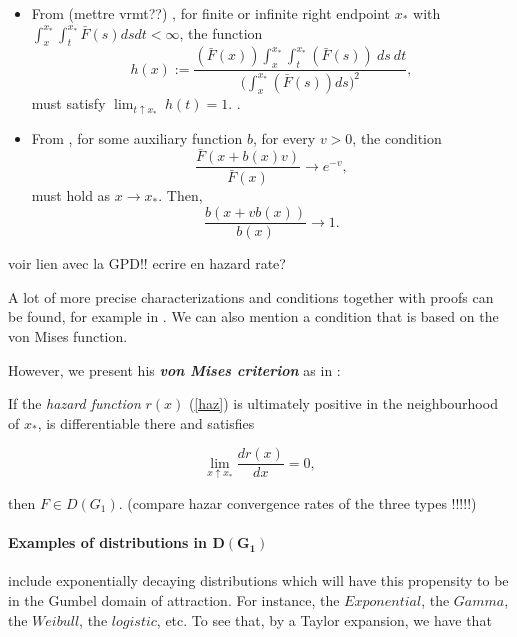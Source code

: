 \documentclass[11pt,a4paper,openany ]{book}
\begin{document}
\begin{itemize}
	\item  From (mettre vrmt??)
	\cite[pp.20]{haan_extreme_2006}, for finite or infinite right endpoint $x_*$ with $\int_x^{x_*}\int_t^{x_*}\bar{F}(s)dsdt<\infty$, the function 
	\begin{equation*}
	h(x):=\frac{(\bar{F}(x))\int_x^{x_*}\int_t^{x_*}(\bar{F}(s))\ ds\ dt}{\bigg(\int_x^{x_*}(\bar{F}(s))ds\bigg)^2},
	\end{equation*}
	must satisfy $\displaystyle{\lim_{t \uparrow x_*}}\ h(t)=1$. . 
	
	\item From \cite[pp.72]{beirlant_statistics_2006},
	for some auxiliary function $b$, for every $v>0$, the condition
	\begin{equation}
	\frac{\bar{F}(x+b(x)v)}{\bar{F}(x)} \to e^{-v},
	\end{equation}
	must hold as $x\to x_*$. Then, 
	\begin{equation*}
	\frac{b(x+vb(x))}{b(x)}\to 1 .
	\end{equation*}
\end{itemize}
voir lien avec la GPD!! ecrire en hazard rate?

A lot of more precise characterizations and conditions together with proofs can be found, for example in \cite[pp.20-33]{haan_extreme_2006}. We can also mention a condition that is based on the von Mises function\cite{}.

However, we present his \emph{\textbf{von Mises criterion}} as in \cite[pp.73]{beirlant_statistics_2006}: 

If the \emph{hazard function} $r(x)$ (\ref{haz})
is ultimately positive in the neighbourhood of $x_*$, is differentiable there and satisfies 

\begin{equation}
\displaystyle{\lim_{x  \uparrow  x_*}} \frac{dr(x)}{dx}=0,
\end{equation}

then $F\in D(G_1)$.
(compare hazar convergence rates of the three types !!!!!)

\paragraph*{Examples of distributions in $\boldsymbol{D(G_1)}$} include  exponentially decaying distributions which
will have this propensity to be in the Gumbel domain of attraction. For instance, the $Exponential$, the $Gamma$, the $Weibull$, the $logistic$, etc.
To see that, by a Taylor expansion, we have that 
\end{document}
